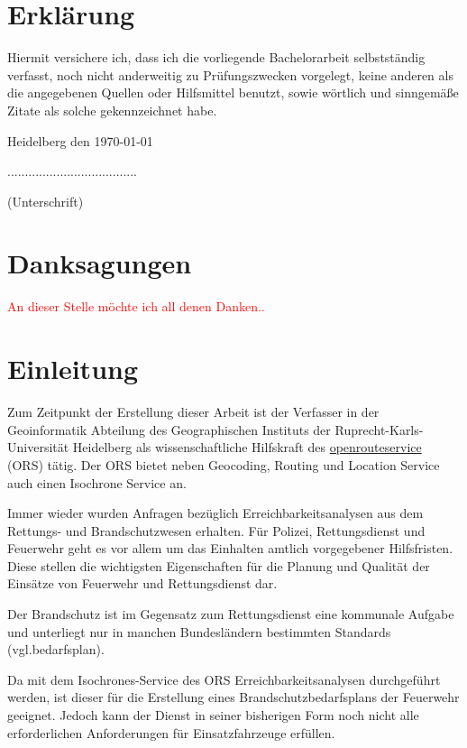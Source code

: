 \documentclass[10pt,a4paper]{article}
\newcommand\todo[1]{\textcolor{red}{#1}}
\begin{document}
\newpage
\section*{Erklärung}
\vspace{1cm}
Hiermit versichere ich, dass ich die vorliegende Bachelorarbeit selbstständig verfasst, noch nicht anderweitig zu Prüfungszwecken vorgelegt, keine anderen als die angegebenen Quellen oder Hilfsmittel benutzt, sowie wörtlich und sinngemäße Zitate als solche gekennzeichnet habe.\par
\bigskip

{\flushleft Heidelberg den \today } {\hfill .....................................\par}
{\hfill (Unterschrift)}

\newpage
\section*{Danksagungen}
\todo{An dieser Stelle möchte ich all denen Danken.. }

\newpage
\tableofcontents

\newpage
\listoffigures


\newpage
\section{Einleitung}

{Zum Zeitpunkt der Erstellung dieser Arbeit ist der Verfasser in der Geoinformatik Abteilung des Geographischen Instituts der Ruprecht-Karls-Universität Heidelberg als wissenschaftliche Hilfskraft des \href{http://www.openrouteservice.org}{openrouteservice} (ORS) tätig. Der ORS bietet neben Geocoding, Routing und Location Service auch einen Isochrone Service an. \par
\bigskip
Immer wieder wurden Anfragen bezüglich Erreichbarkeitsanalysen aus dem Rettungs- und Brandschutzwesen erhalten. Für Polizei, Rettungsdienst und Feuerwehr geht es vor allem um das Einhalten amtlich vorgegebener Hilfsfristen. Diese stellen die wichtigsten Eigenschaften für die Planung und Qualität der Einsätze von Feuerwehr und Rettungsdienst dar.\par
Der Brandschutz ist im Gegensatz zum Rettungsdienst eine kommunale Aufgabe und unterliegt nur in manchen Bundesländern bestimmten Standards (vgl.{bedarfsplan}). }
\medskip

Da mit dem Isochrones-Service des ORS Erreichbarkeitsanalysen durchgeführt werden, ist dieser für die Erstellung eines Brandschutzbedarfsplans der Feuerwehr geeignet. Jedoch kann der Dienst in seiner bisherigen Form noch nicht alle erforderlichen Anforderungen für Einsatzfahrzeuge erfüllen.
\medskip
\end{document}
